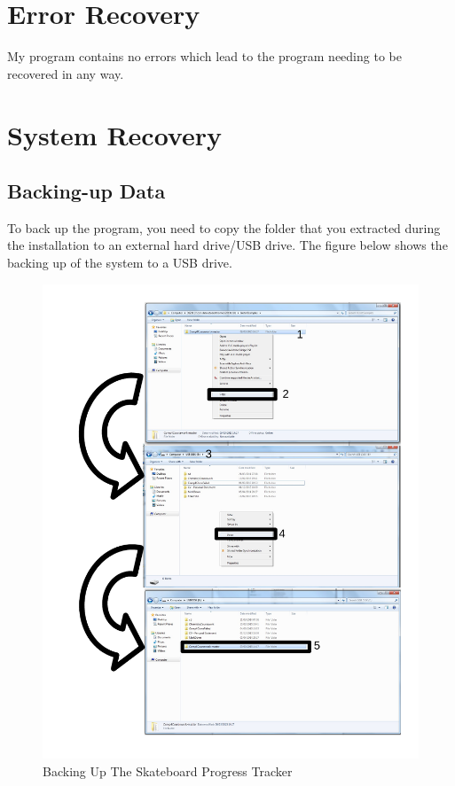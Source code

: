 \section{Error Recovery}

My program contains no errors which lead to the program needing to be recovered in any way.




\section{System Recovery}

\subsection{Backing-up Data}

To back up the program, you need to copy the folder that you extracted during the installation to an external hard drive/USB drive. The figure below shows the backing up of the system to a USB drive.

\begin{figure}[H]
    \includegraphics[width=\textwidth]{./Manual/Images/BackUp.pdf}
    \caption{Backing Up The Skateboard Progress Tracker} \label{fig:BackUp}
\end{figure}

